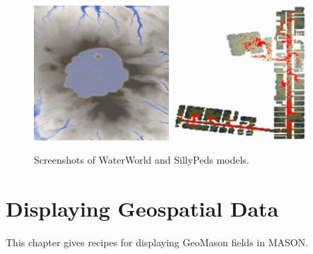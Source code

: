 \documentclass[twoside,10pt]{book}
\begin{document}
\begin{figure}[th]
  \centering
  \includegraphics[width=0.45\textwidth]{WaterWorld.png}
  \includegraphics[width=0.45\textwidth]{SillyPeds.png}
  \caption{Screenshots of WaterWorld and SillyPeds models.}
  \label{fig:gradients}
\end{figure}







\chapter{Displaying Geospatial Data}
\label{ch:displaying}

This chapter gives recipes for displaying GeoMason fields in MASON.


\end{document}
